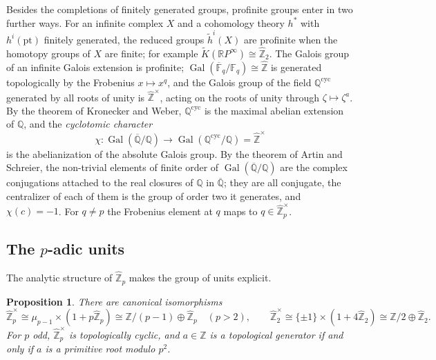 \documentclass[11pt]{amsart}
\theoremstyle{plain}
\newtheorem{proposition}[theorem]{Proposition}
\theoremstyle{definition}
\numberwithin{equation}{section}
\newcommand{\Z}{\mathbb{Z}}
\newcommand{\Q}{\mathbb{Q}}
\newcommand{\F}{\mathbb{F}}
\newcommand{\Zhat}{\widehat{\mathbb{Z}}}
\newcommand{\Qbar}{\overline{\mathbb{Q}}}
\newcommand{\RP}{\mathbb{R}P}
\newcommand{\units}{^{\times}}
\DeclareMathOperator{\Gal}{Gal}
\begin{document}
Besides the completions of finitely generated groups, profinite groups enter in two further ways.
For an infinite complex $X$ and a cohomology theory $h^*$ with $h^i(\mathrm{pt})$ finitely generated, the reduced groups $\widetilde h^i(X)$ are profinite when the homotopy groups of $X$ are finite; for example $\widetilde K(\RP^\infty)\cong\Zhat_2$.
The Galois group of an infinite Galois extension is profinite; $\Gal(\overline{\F}_q/\F_q)\cong\Zhat$ is generated topologically by the Frobenius $x\mapsto x^q$, and the Galois group of the field $\Q^{\mathrm{cyc}}$ generated by all roots of unity is $\Zhat\units$, acting on the roots of unity through $\zeta\mapsto\zeta^a$.
By the theorem of Kronecker and Weber, $\Q^{\mathrm{cyc}}$ is the maximal abelian extension of $\Q$, and the \emph{cyclotomic character}
\[
\chi\colon\Gal(\Qbar/\Q)\longrightarrow\Gal(\Q^{\mathrm{cyc}}/\Q)=\Zhat\units
\]
is the abelianization of the absolute Galois group.
By the theorem of Artin and Schreier, the non-trivial elements of finite order of $\Gal(\Qbar/\Q)$ are the complex conjugations attached to the real closures of $\Q$ in $\Qbar$; they are all conjugate, the centralizer of each of them is the group of order two it generates, and $\chi(c)=-1$.
For $q\ne p$ the Frobenius element at $q$ maps to $q\in\Zhat_p\units$.

\subsection{The $p$-adic units}
The analytic structure of $\Zhat_p$ makes the group of units explicit.

\begin{proposition}\label{prop:units}
There are canonical isomorphisms
\[
\Zhat_p\units\cong\mu_{p-1}\times(1+p\Zhat_p)\cong\Z/(p-1)\oplus\Zhat_p\quad(p>2),\qquad \Zhat_2\units\cong\{\pm1\}\times(1+4\Zhat_2)\cong\Z/2\oplus\Zhat_2 .
\]
For $p$ odd, $\Zhat_p\units$ is topologically cyclic, and $a\in\Z$ is a topological generator if and only if $a$ is a primitive root modulo $p^2$.
\end{proposition}
\end{document}

